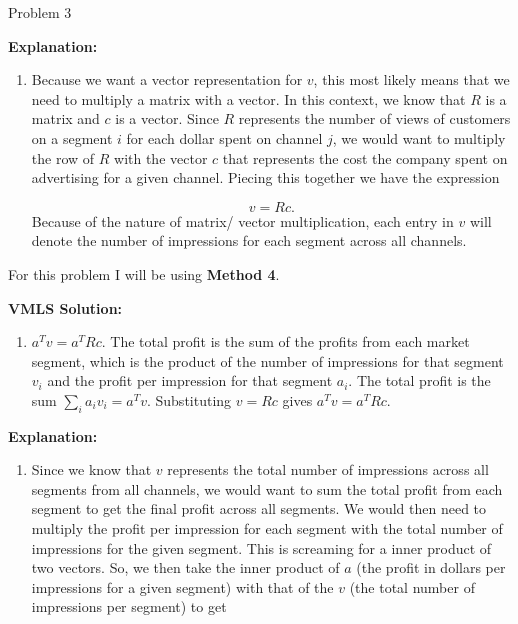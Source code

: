 \begin{problem}{Problem 3}
\begin{highlight}
        \noindent \textbf{Explanation:}

        \begin{enumerate}[label = (\alph*), start = 2]
            \item Because we want a vector representation for $v$, this most likely means that we need to multiply a matrix with a vector. In this context, we know that $R$ is a matrix and $c$ is a 
            vector. Since $R$ represents the number of views of customers on a segment $i$ for each dollar spent on channel $j$, we would want to multiply the row of $R$ with the vector $c$ that represents
            the cost the company spent on advertising for a given channel. Piecing this together we have the expression

            \begin{equation}
                v = Rc.
            \end{equation}
            Because of the nature of matrix/ vector multiplication, each entry in $v$ will denote the number of impressions for each segment across all channels.
        \end{enumerate}
    \end{highlight}

    \begin{highlight}
        For this problem I will be using \textbf{Method 4}. \vspace*{1em}

        \noindent \textbf{VMLS Solution:}

        \begin{enumerate}[label = (\alph*), start = 3]
            \item $a^{T}v = a^{T}Rc$. The total profit is the sum of the profits from each market segment, which is the product of the number of impressions for that segment $v_{i}$ and the profit 
            per impression for that segment $a_{i}$. The total profit is the sum $\sum_{i} a_{i}v_{i} = a^{T}v$. Substituting $v = Rc$ gives $a^{T}v = a^{T}Rc$.
        \end{enumerate}

        \noindent \textbf{Explanation:}

        \begin{enumerate}[label = (\alph*), start = 3]
            \item Since we know that $v$ represents the total number of impressions across all segments from all channels, we would want to sum the total profit from each segment to get the final 
            profit across all segments. We would then need to multiply the profit per impression for each segment with the total number of impressions for the given segment. This is screaming for a
            inner product of two vectors. So, we then take the inner product of $a$ (the profit in dollars per impressions for a given segment) with that of the $v$ (the total number of impressions 
            per segment) to get


\end{enumerate}
\end{highlight}
\end{problem}
